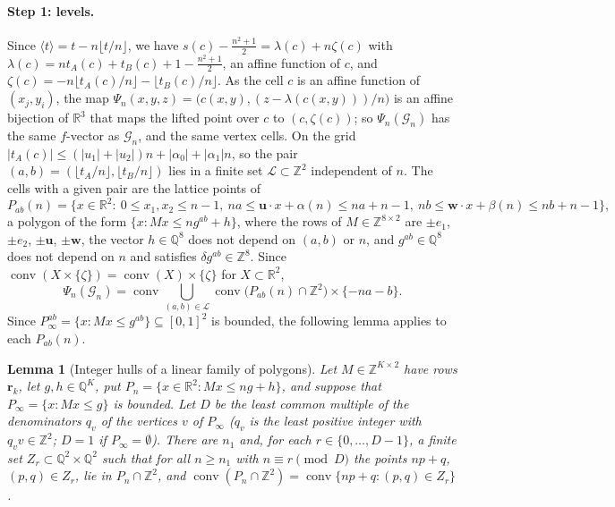 \documentclass[11pt,a4paper]{article}
\theoremstyle{plain}
\newtheorem{lemma}[theorem]{Lemma}
\theoremstyle{definition}
\theoremstyle{remark}
\newcommand{\R}{\mathbb{R}}
\newcommand{\Z}{\mathbb{Z}}
\begin{document}
\paragraph{Step 1: levels.}
Since $\langle t\rangle=t-n\lfloor t/n\rfloor$, we have $s(c)-\frac{n^2+1}2=\lambda(c)+n\zeta(c)$ with $\lambda(c)=nt_A(c)+t_B(c)+1-\frac{n^2+1}2$, an affine function of $c$, and $\zeta(c)=-n\lfloor t_A(c)/n\rfloor-\lfloor t_B(c)/n\rfloor$.
As the cell $c$ is an affine function of $(x_j,y_i)$, the map $\Psi_n(x,y,z)=\bigl(c(x,y),(z-\lambda(c(x,y)))/n\bigr)$ is an affine bijection of $\R^3$ that maps the lifted point over $c$ to $(c,\zeta(c))$; so $\Psi_n(\mathcal G_n)$ has the same $f$-vector as $\mathcal G_n$, and the same vertex cells.
On the grid $|t_A(c)|\le(|u_1|+|u_2|)n+|\alpha_0|+|\alpha_1|n$, so the pair $(a,b)=(\lfloor t_A/n\rfloor,\lfloor t_B/n\rfloor)$ lies in a finite set $\mathcal L\subset\Z^2$ independent of $n$.
The cells with a given pair are the lattice points of
\[
P_{ab}(n)=\{x\in\R^2:\ 0\le x_1,x_2\le n-1,\ na\le\mathbf u\cdot x+\alpha(n)\le na+n-1,\ nb\le\mathbf w\cdot x+\beta(n)\le nb+n-1\},
\]
a polygon of the form $\{x:Mx\le ng^{ab}+h\}$, where the rows of $M\in\Z^{8\times2}$ are $\pm e_1$, $\pm e_2$, $\pm\mathbf u$, $\pm\mathbf w$, the vector $h\in\mathbb Q^8$ does not depend on $(a,b)$ or $n$, and $g^{ab}\in\mathbb Q^8$ does not depend on $n$ and satisfies $\delta g^{ab}\in\Z^8$.
Since $\operatorname{conv}(X\times\{\zeta\})=\operatorname{conv}(X)\times\{\zeta\}$ for $X\subset\R^2$,
\begin{equation}
\label{eq:levels}
\Psi_n(\mathcal G_n)=\operatorname{conv}\bigcup_{(a,b)\in\mathcal L}\operatorname{conv}\bigl(P_{ab}(n)\cap\Z^2\bigr)\times\{-na-b\}.
\end{equation}
Since $P_\infty^{ab}=\{x:Mx\le g^{ab}\}\subseteq[0,1]^2$ is bounded, the following lemma applies to each $P_{ab}(n)$.

\begin{lemma}[Integer hulls of a linear family of polygons]
\label{lem:linear-polygons}
Let $M\in\Z^{K\times2}$ have rows $\mathbf r_k$, let $g,h\in\mathbb Q^K$, put $P_n=\{x\in\R^2:Mx\le ng+h\}$, and suppose that $P_\infty=\{x:Mx\le g\}$ is bounded.
Let $D$ be the least common multiple of the denominators $q_v$ of the vertices $v$ of $P_\infty$ ($q_v$ is the least positive integer with $q_vv\in\Z^2$; $D=1$ if $P_\infty=\emptyset$).
There are $n_1$ and, for each $r\in\{0,\dots,D-1\}$, a finite set $Z_r\subset\mathbb Q^2\times\mathbb Q^2$ such that for all $n\ge n_1$ with $n\equiv r\pmod D$ the points $np+q$, $(p,q)\in Z_r$, lie in $P_n\cap\Z^2$, and $\operatorname{conv}(P_n\cap\Z^2)=\operatorname{conv}\{np+q:(p,q)\in Z_r\}$.
\end{lemma}
\end{document}

